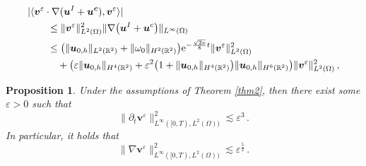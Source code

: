 \documentclass[10pt,a4paper]{amsart}
\newtheorem{proposition}{Proposition}
\begin{document}
	\begin{align}\label{4.7}
		&|\langle{\boldsymbol v}^{\varepsilon} \cdot \nabla
		(
		\boldsymbol{u}^I+
		\boldsymbol{u^c}
		),{\boldsymbol v}^{\varepsilon}\rangle|\notag\\
		&\qquad\leq\lVert {\boldsymbol v}^{\varepsilon} \rVert^2_{{L}^2(\Omega)}
		\lVert \nabla
		\big(
		\boldsymbol u^{I}+\boldsymbol u^{c}
		\big)
		\rVert_{{L}^\infty(\Omega)}
		\notag\\
		&\qquad\leq
		\big(
		\lVert{\boldsymbol{u}}_{0,h}\rVert_{L^2(\mathbb{R}^2)}+\lVert{\omega}_0\rVert_{H^2(\mathbb{R}^2)}
		\big)\mathrm{e}^{-\frac{\sqrt{2\nu}}{8}  t}\lVert {\boldsymbol v}^{\varepsilon} \rVert^2_{{L}^2(\Omega)}
		\notag\\
		&\qquad\quad+\big(\varepsilon
		\lVert {\boldsymbol{u}}_{0,h} \rVert_{H^{4}(\mathbb{R}^2)}
		+\varepsilon^2
		\big(
		1+
		\lVert {\boldsymbol{u}}_{0,h} \rVert_{H^{4}(\mathbb{R}^2)}
		\big)
		\lVert {\boldsymbol{u}}_{0,h} \rVert_{H^{6}(\mathbb{R}^2)}\big)\lVert {\boldsymbol v}^{\varepsilon} \rVert^2_{{L}^2(\Omega)}
		\,,
	\end{align}

\begin{proposition}\label{prop8}
	Under the assumptions of Theorem \ref{thm2}, then there exist some $\varepsilon>0$ such that
	\begin{equation}\label{4.1.1}
		\lVert\partial_t\boldsymbol v^{\varepsilon}\rVert^2_{L^\infty([0,T),{L}^2(\Omega))}
		\lesssim\varepsilon^3\,.
	\end{equation}
	In particular, it holds that
	\begin{equation}\label{4.2.1}
		\lVert\nabla\boldsymbol v^{\varepsilon}\rVert^2_{L^\infty([0,T),{L}^2(\Omega))}
		\lesssim\varepsilon^{\frac52}\,.
	\end{equation}
\end{proposition}
\end{document}
